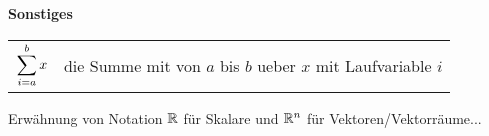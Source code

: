 \begin{center}\textbf{Sonstiges}\end{center}
\begin{tabular}{cl}
  $\displaystyle\sum_{i=a}^b x$ & die Summe mit von $a$ bis $b$ ueber $x$ mit Laufvariable $i$ \\
\end{tabular}

Erwähnung von Notation $\mathbb{R}$ für Skalare und $\mathbb{R}^n$ für Vektoren/Vektorräume...

